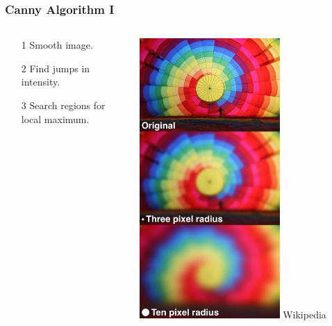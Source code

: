\documentclass{beamer}
\begin{document}
\begin{frame}
\frametitle{Canny Algorithm I}
\begin{columns}
\begin{column}{0.6\textwidth}
\begin{enumerate}
\item[1] Smooth image.
\item[2] Find jumps in intensity.
\item[3] Search regions for local maximum.
\end{enumerate}
\end{column}
\begin{column}{0.4\textwidth}
\begin{center}
\includegraphics[width=0.65\textwidth]{gaussian_blur_example}
\linebreak
{\tiny Wikipedia}
\end{center}
\end{column}
\end{columns}
\end{frame}
\end{document}

